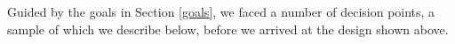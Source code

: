 \documentclass[conference]{IEEEtran}
\newcommand{\toolname}{Perquimans }
\begin{document}
	Guided by the goals in Section \ref{goals}, we faced a number of decision points, a
	sample of which we describe below, before we arrived at the design shown above.
	\begin{itemize}
		
		

\end{itemize}
\end{document}
